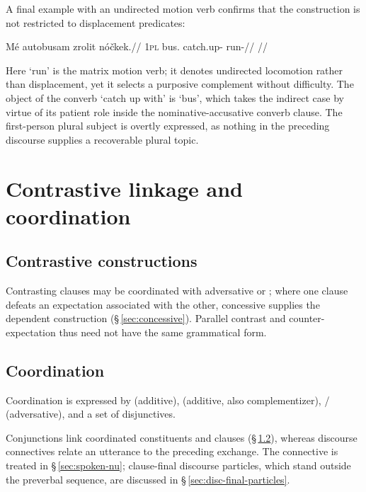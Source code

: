 A final example with an undirected motion verb confirms that the construction is
not restricted to displacement predicates:

\ex\label{ex:purp-run}%
\begingl
\gla Mé autobusam zrolit nóčkek.//
\glb \textsc{1pl} bus.\Ind{} catch.up-\Purp{} run-\Pf{}//
\glft {}//
\endgl
\xe

Here  `run' is the matrix motion verb; it denotes undirected
locomotion rather than displacement, yet it selects a purposive complement
without difficulty. The object of the converb  `catch up with' is
 `bus', which takes the indirect case by virtue of its patient
role inside the nominative-accusative converb clause. The first-person plural
subject  is overtly expressed, as nothing in the preceding discourse
supplies a recoverable plural topic.

\section{Contrastive linkage and coordination}

\subsection{Contrastive constructions}\label{sec:contrastive}

Contrasting clauses may be coordinated with adversative  or
; where one clause defeats an expectation associated with the other,
concessive  supplies the dependent construction
(§\,\ref{sec:concessive}). Parallel contrast and counter-expectation thus
need not have the same grammatical form.

\subsection{Coordination}\label{sec:coordination}


Coordination is expressed by  (additive),  (additive, also
complementizer),  /  (adversative), and a set of disjunctives.


Conjunctions link coordinated constituents and clauses
(§\,\ref{sec:coordination}), whereas discourse connectives relate an utterance
to the preceding exchange. The connective  is treated in
§\,\ref{sec:spoken-nu}; clause-final discourse particles, which stand outside
the preverbal sequence, are discussed in §\,\ref{sec:disc-final-particles}.


